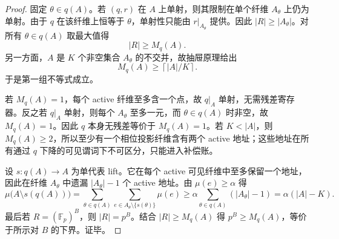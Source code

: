 \begin{proof}
固定 \(\theta\in q(A)\)。若 \((q,r)\) 在 \(A\) 上单射，则其限制在单个纤维 \(A_\theta\) 上仍为单射。由于 \(q\) 在该纤维上恒等于 \(\theta\)，单射性只能由 \(r|_{A_\theta}\) 提供。因此 \(|R|\ge |A_\theta|\)。对所有 \(\theta\in q(A)\) 取最大值得
\[
|R|\ge M_q(A).
\]
另一方面，\(A\) 是 \(K\) 个非空集合 \(A_\theta\) 的不交并，故抽屉原理给出
\[
M_q(A)\ge \left\lceil |A|/K\right\rceil .
\]
于是第一组不等式成立。

若 \(M_q(A)=1\)，每个 active 纤维至多含一个点，故 \(q|_A\) 单射，无需残差寄存器。反之若 \(q|_A\) 单射，则每个 \(A_\theta\) 至多一元，而 \(\theta\in q(A)\) 时非空，故 \(M_q(A)=1\)。因此 \(q\) 本身无残差等价于 \(M_q(A)=1\)。若 \(K<|A|\)，则 \(M_q(A)\ge2\)，所以至少有一个相位投影纤维含有两个 active 地址；这些地址在所有通过 \(q\) 下降的可见谓词下不可区分，只能进入补偿账。

设 \(s:q(A)\to A\) 为单代表 lift。它在每个 active 可见纤维中至多保留一个地址，因此在纤维 \(A_\theta\) 中遗漏 \(|A_\theta|-1\) 个 active 地址。由 \(\mu(e)\ge\alpha\) 得
\[
\mu\bigl(A\setminus s(q(A))\bigr)
=\sum_{\theta\in q(A)}\sum_{e\in A_\theta\setminus\{s(\theta)\}}\mu(e)
\ge \alpha\sum_{\theta\in q(A)}(|A_\theta|-1)
=\alpha(|A|-K).
\]
最后若 \(R=(\mathbb F_p)^B\)，则 \(|R|=p^B\)。结合 \(|R|\ge M_q(A)\) 得 \(p^B\ge M_q(A)\)，等价于所示对 \(B\) 的下界。证毕。
\end{proof}

